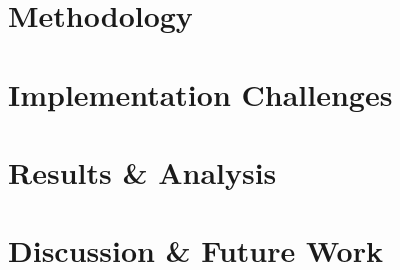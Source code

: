 \documentclass[12pt]{article}
\begin{document}
\section{Methodology}







\section{Implementation Challenges}





\section{Results \& Analysis}







\section{Discussion \& Future Work}
\end{document}
